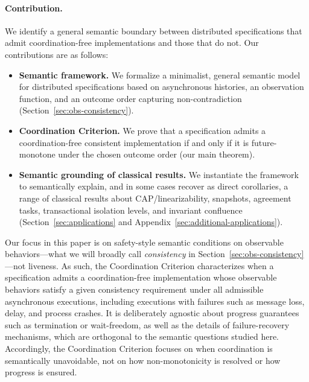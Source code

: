 \paragraph{Contribution.}
We identify a general semantic boundary between
distributed specifications that admit coordination-free implementations and
those that do not.
Our contributions are as follows:
\begin{itemize}[nosep]
  \item \textbf{Semantic framework.} We formalize a minimalist, general semantic model
        for distributed specifications based on asynchronous histories, an
        observation function, and an outcome order capturing non-contradiction
        (Section~\ref{sec:obs-consistency}).
  \item \textbf{Coordination Criterion.} We prove that a specification admits a
      coordination-free consistent implementation if and only if it is future-monotone
      under the chosen outcome order (our main
        theorem).
  \item \textbf{Semantic grounding of classical results.} We instantiate the
        framework to semantically explain, and in some cases recover as direct
        corollaries, a range of
        classical results about CAP/linearizability, snapshots, agreement tasks,
        transactional isolation levels, and invariant confluence
        (Section~\ref{sec:applications} and Appendix~\ref{sec:additional-applications}).
\end{itemize}

Our focus in this paper is on safety-style semantic conditions on observable
behaviors—what we will broadly call \emph{consistency} in
Section~\ref{sec:obs-consistency}—not liveness.
As such, the Coordination Criterion characterizes when a specification admits a
coordination-free implementation whose observable behaviors satisfy a given
consistency requirement under all admissible asynchronous executions, including
executions with failures such as message loss, delay, and process crashes.
It is deliberately agnostic about progress guarantees such as termination or
wait-freedom, as well as the details of failure-recovery mechanisms, which are
orthogonal to the semantic questions studied here.
Accordingly, the Coordination Criterion focuses on when coordination is
semantically unavoidable, not on how non-monotonicity is resolved or how
progress is ensured.


